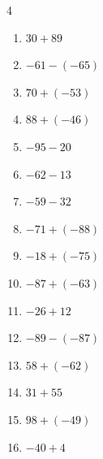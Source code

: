 \begin{multicols}{4}
\begin{enumerate}
  \item $30+89$

        \phantom{$=119$}

  \item $-61-(-65)$

        \phantom{$=4$}

  \item $70+(-53)$

        \phantom{$=17$}

  \item $88+(-46)$

        \phantom{$=42$}

  \item $-95-20$

        \phantom{$=-115$}

  \item $-62-13$

        \phantom{$=-75$}

  \item $-59-32$

        \phantom{$=-91$}

  \item $-71+(-88)$

        \phantom{$=-159$}

  \item $-18+(-75)$

        \phantom{$=-93$}

  \item $-87+(-63)$

        \phantom{$=-150$}

  \item $-26+12$

        \phantom{$=-14$}

  \item $-89-(-87)$

        \phantom{$=-2$}

  \item $58+(-62)$

        \phantom{$=-4$}

  \item $31+55$

        \phantom{$=86$}

  \item $98+(-49)$

        \phantom{$=49$}

  \item $-40+4$

        \phantom{$=-36$}


\end{enumerate}
\end{multicols}
